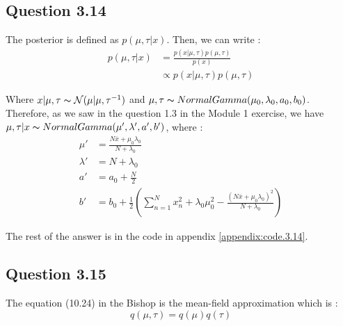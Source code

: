 \documentclass{article}
\begin{document}
\subsection*{Question 3.14}

The posterior is defined as $p(\mu, \tau|x)$. Then, we can write :
\begin{equation}
    \begin{split}
        p(\mu, \tau|x) & = \frac{p(x|\mu, \tau)p(\mu, \tau)}{p(x)} \\
                       & \propto p(x|\mu, \tau)p(\mu, \tau)
    \end{split}
\end{equation}

Where $x|\mu, \tau \thicksim \mathcal{N}(\mu|\mu, \tau^{-1})$ and $\mu, \tau \thicksim NormalGamma(\mu_0, \lambda_0, a_0, b_0)$.
Therefore, as we saw in the question 1.3 in the Module 1 exercise, we have $\mu, \tau|x \thicksim NormalGamma(\mu', \lambda', a', b')$, where :
\begin{equation}
    \begin{split}
        \mu'     & = \frac{N\overline{x} + \mu_0\lambda_0}{N + \lambda_0}                                                                                       \\
        \lambda' & = N + \lambda_0                                                                                                                              \\
        a'       & = a_0 + \frac{N}{2}                                                                                                                          \\
        b'       & = b_0 + \frac{1}{2}\left(\sum_{n=1}^{N}x_n^2 + \lambda_0\mu_0^2 - \frac{\left(N\overline{x} + \mu_0\lambda_0\right)^2}{N + \lambda_0}\right)
    \end{split}
\end{equation}

The rest of the answer is in the code in appendix \ref{appendix:code.3.14}.

\subsection*{Question 3.15}

The equation (10.24) in the Bishop is the mean-field approximation which is :
\begin{equation}
    q(\mu, \tau) = q(\mu)q(\tau)
\end{equation}
\end{document}
